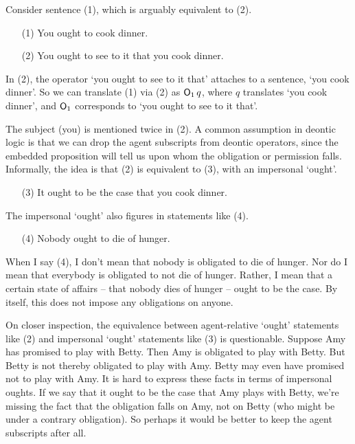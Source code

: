 Consider sentence (1), which is arguably equivalent to (2).
\begin{itemize}[leftmargin=10mm]
\itemsep-1mm
\item[(1)] You ought to cook dinner.
\item[(2)] You ought to see to it that you cook dinner.
\end{itemize}
In (2), the operator `you ought to see to it that' attaches to a sentence, `you
cook dinner'. So we can translate (1) via (2) as $\operatorname{\mathsf{O}}_1 q$, where $q$ translates
`you cook dinner', and $\operatorname{\mathsf{O}}_1$ corresponds to `you ought to see to it that'.

The subject (you) is mentioned twice in (2). A common assumption in deontic
logic is that we can drop the agent subscripts from deontic operators, since the
embedded proposition will tell us upon whom the obligation or permission falls.
Informally, the idea is that (2) is equivalent to (3), with an impersonal
`ought'.
\begin{itemize}[leftmargin=10mm]
\itemsep1mm
\item[(3)] It ought to be the case that you cook dinner.
\end{itemize}

The impersonal `ought' also figures in statements like (4).
\begin{itemize}[leftmargin=10mm]
\itemsep1mm
\item[(4)] Nobody ought to die of hunger.
\end{itemize}
When I say (4), I don't mean that nobody is obligated to die of hunger. Nor do I
mean that everybody is obligated to not die of hunger. Rather, I mean that a
certain state of affairs -- that nobody dies of hunger -- ought to be the case.
By itself, this does not impose any obligations on anyone.


On closer inspection, the equivalence between agent-relative `ought' statements
like (2) and impersonal `ought' statements like (3) is questionable. Suppose Amy
has promised to play with Betty. Then Amy is obligated to play with Betty. But
Betty is not thereby obligated to play with Amy. Betty may even have promised
not to play with Amy. It is hard to express these facts in terms of impersonal
oughts. If we say that it ought to be the case that Amy plays with Betty, we're
missing the fact that the obligation falls on Amy, not on Betty (who might be
under a contrary obligation). So perhaps it would be better to keep the agent
subscripts after all.

